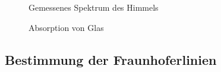 \documentclass{article}
\begin{document}
\begin{figure}[!p]
    \centering
    \caption{Gemessenes Spektrum des Himmels}
    \label{fig:HimmelVgl}
\end{figure}

\phantom{.}

\begin{figure}[!p]
    \centering
    \caption{Absorption von Glas}
    \label{fig:AbsGlas}
\end{figure}

\phantom{.}

\clearpage
\newpage
\subsection{Bestimmung der Fraunhoferlinien}
\end{document}
